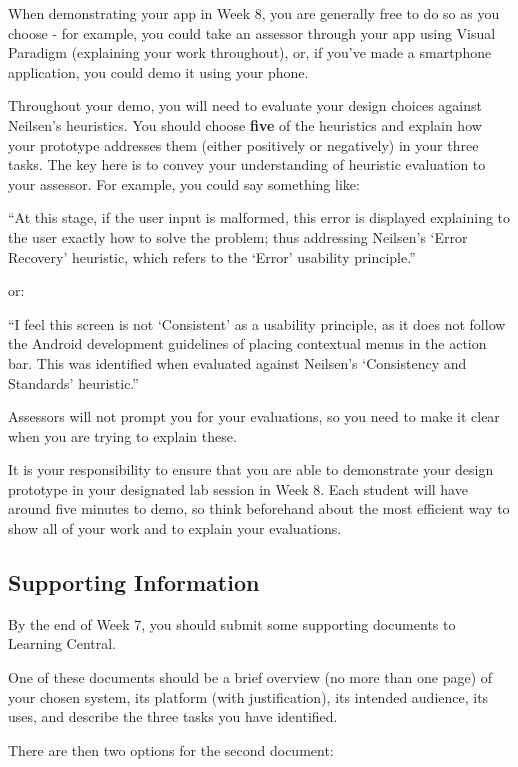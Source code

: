 \documentclass[11pt,a4paper]{report}
\begin{document}
When demonstrating your app in Week 8, you are generally free to do so as you choose - for example, you could take an assessor through your app using Visual Paradigm (explaining your work throughout), or, if you've made a smartphone application, you could demo it using your phone.

Throughout your demo, you will need to evaluate your design choices against Neilsen's heuristics. You should choose \textbf{five}  of the heuristics and explain how your prototype addresses them (either positively or negatively) in your three tasks. The key here is to convey your understanding of heuristic evaluation to your assessor. For example, you could say something like:
\begin{center}
    ``At this stage, if the user input is malformed, this error is displayed explaining to the user exactly how to solve the problem; thus addressing Neilsen's `Error Recovery' heuristic, which refers to the `Error' usability principle.''
\end{center}
or:
\begin{center}
   ``I feel this screen is not `Consistent' as a usability principle, as it does not follow the Android development guidelines of placing contextual menus in the action bar. This was identified when evaluated against Neilsen's `Consistency and Standards' heuristic.''
\end{center}

Assessors will not prompt you for your evaluations, so you need to make it clear when you are trying to explain these.

It is your responsibility to ensure that you are able to demonstrate your design prototype in your designated lab session in Week 8. Each student will have around five minutes to demo, so think beforehand about the most efficient way to show all of your work and to explain your evaluations.


\subsection*{Supporting Information}
By the end of Week 7, you should submit some supporting documents to Learning Central.

One of these documents should be a brief overview (no more than one page) of your chosen system, its platform (with justification), its intended audience, its uses, and describe the three tasks you have identified.

There are then two options for the second document:
\end{document}
